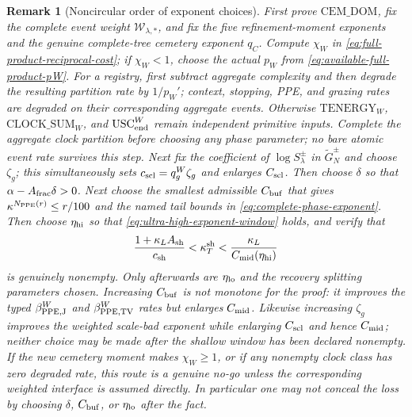 \documentclass[11pt]{article}
\newtheorem{remark}[theorem]{Remark}
\begin{document}
\begin{remark}[Noncircular order of exponent choices]
\label{rem:parameter-selection-order}
First prove $\mathrm{CEM\_DOM}$, fix the complete event weight
$\mathscr W_{\lambda,*}$, and fix the five refinement-moment exponents and
the genuine complete-tree cemetery exponent $q_C$.  Compute $\chi_W$ in
\eqref{eq:full-product-reciprocal-cost}; if $\chi_W<1$, choose the actual
$p_W$ from \eqref{eq:available-full-product-pW}.  For a registry, first
subtract aggregate complexity and then degrade the resulting partition rate
by $1/p_W'$; context, stopping, PPE, and grazing rates are degraded on their
corresponding aggregate events.  Otherwise $\mathrm{TENERGY}_{W}$,
$\mathrm{CLOCK\_SUM}_{W}$, and $\mathrm{USC}_{\rm end}^{W}$ remain independent
primitive inputs.  Complete the aggregate clock partition before choosing
any phase parameter; no bare atomic event rate survives this step.  Next fix the coefficient
of $\log S_\lambda^\pm$ in
$\widetilde G_N^\pm$ and choose $\zeta_g$; this simultaneously sets
$c_{\rm scl}=q_g^W\zeta_g$ and enlarges $C_{\rm scl}$.  Then choose $\delta$
so that $\alpha-A_{\rm frac}\delta>0$.  Next choose
the smallest admissible $C_{\rm buf}$ that gives
$\kappa^{N_{\rm PPE}(r)}\le r/100$ and the named tail bounds in
\eqref{eq:complete-phase-exponent}.  Then choose $\eta_{\rm hi}$ so that
\eqref{eq:ultra-high-exponent-window} holds, and verify that
\[
 \frac{1+\kappa_LA_{\rm sh}}{c_{\rm sh}}
 <\kappa_T^{\rm sh}<
 \frac{\kappa_L}{C_{\rm mid}(\eta_{\rm hi})}
\]
is genuinely nonempty.  Only afterwards are $\eta_{\rm lo}$ and the recovery
splitting parameters chosen.  Increasing $C_{\rm buf}$ is not monotone for
the proof: it improves the typed $\beta_{\rm PPE,J}^{W}$ and
$\beta_{\rm PPE,TV}^{W}$ rates but enlarges $C_{\rm mid}$.
Likewise increasing $\zeta_g$ improves the weighted scale-bad exponent while
enlarging $C_{\rm scl}$ and hence $C_{\rm mid}$; neither choice may be made
after the shallow window has been declared nonempty.
If the new cemetery moment makes $\chi_W\ge1$, or if any nonempty clock
class has zero degraded rate, this route is a genuine no-go unless the
corresponding weighted interface is assumed directly.  In particular one
may not conceal the loss by choosing $\delta$, $C_{\rm buf}$, or
$\eta_{\rm lo}$ after the fact.
\end{remark}
\end{document}
